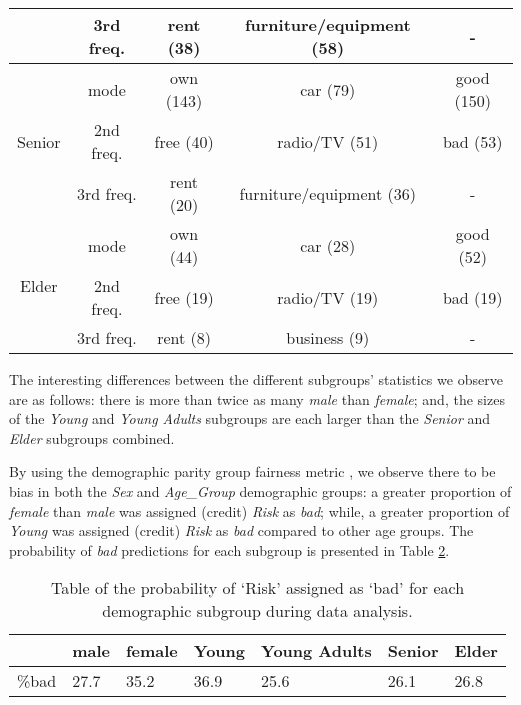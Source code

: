 \documentclass[conference]{IEEEtran}
\begin{document}
\begin{table}[ht]
\begin{center}
\begin{tabular}{ |c|c|c|c|c| }
        & 3rd freq. & rent (38) & furniture/equipment (58) & - \\
        \hline 
        \multirow{3}{2.5em}{Senior} 
        & mode              & own (143) & car (79)& good (150)\\
        & 2nd freq. & free (40) & radio/TV (51) & bad (53) \\
        & 3rd freq. & rent (20) & furniture/equipment (36) & -\\ 
        \hline
        \multirow{3}{2.5em}{Elder} 
        & mode              & own (44)  & car (28) & good (52) \\ 
        & 2nd freq. & free (19) & radio/TV (19)& bad (19)\\
        & 3rd freq. & rent (8)  & business (9) & - \\ 
        \hline
    \end{tabular}
    \label{table:3}
    \end{center}
\end{table}

The interesting differences between the different subgroups' statistics we observe are as follows: there is more than twice as many \emph{male} than \emph{female}; and, the sizes of the \emph{Young} and \emph{Young Adults} subgroups are each larger than the \emph{Senior} and \emph{Elder} subgroups combined.


By using the demographic parity group fairness metric \cite{DBLP:journals/corr/abs-1710-03184}, we observe there to be bias in both the \emph{Sex} and \emph{Age\_Group} demographic groups: a greater proportion of \emph{female} than \emph{male} was assigned (credit) \emph{Risk} as \emph{bad}; while, a greater proportion of \emph{Young} was assigned (credit) \emph{Risk} as \emph{bad} compared to other age groups. The probability of \emph{bad} predictions for each subgroup is presented in Table \ref{table:4}. 

\begin{table}[ht]
    \begin{center}
    \caption{Table of the probability of `Risk' assigned as `bad' for each demographic subgroup during data analysis.}
    \begin{tabularx}{0.49\textwidth} { |X|X|X|X|X|X|X| } 
        \hline
                & male & female & Young & Young Adults & Senior & Elder \\ 
            \hline
            \%bad & 27.7 & 35.2 & 36.9 & 25.6 & 26.1 & 26.8 \\
            \hline
    \end{tabularx}
    \label{table:4}
    \end{center}
\end{table}
\end{document}
